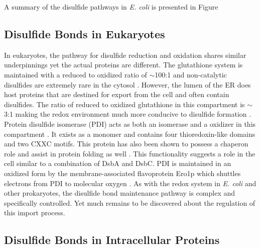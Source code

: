 {A summary of the disulfide pathways in \emph{E. coli} is presented in Figure

\subsection{Disulfide Bonds in Eukaryotes}

In eukaryotes, the pathway for disulfide reduction and oxidation shares similar
underpinnings yet the actual proteins are different.  The glutathione system is
maintained with a reduced to oxidized ratio of $\sim$100:1 and non-catalytic
disulfides are extremely rare in the cytosol \cite{95}.  However, the lumen of
the ER does host proteins that are destined for export from the cell and often
contain disulfides.  The ratio of reduced to oxidized glutathione in this
compartment is $\sim$3:1 making the redox environment much more conducive to
disulfide formation \cite{95}.  Protein disulfide isomerase (PDI) acts as both
an isomerase and a oxidizer in this compartment \cite{96,99}.  It exists as a
monomer and contains four thioredoxin-like domains and two CXXC motifs.  This
protein has also been shown to possess a chaperon role and assist in protein
folding as well \cite{97}.  This functionality suggests a role in the cell
similar to a combination of DsbA and DsbC.  PDI is maintained in an oxidized
form by the membrane-associated flavoprotein Ero1p \cite{102,103} which
shuttles electrons from PDI to molecular oxygen \cite{105,108}.  As with the
redox system in \emph{E. coli} and other prokaryotes, the disulfide bond
maintenance pathway is complex and specifically controlled.  Yet much remains
to be discovered about the regulation of this import process.

\subsection{Disulfide Bonds in Intracellular Proteins}

}
